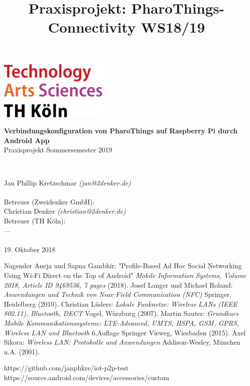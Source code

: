 \documentclass[12pt,a4paper]{article}
\title{Praxisprojekt: PharoThings-Connectivity WS18/19}
\begin{document}
	\begin{titlepage}
    \includegraphics[width=0.4\textwidth]{th_logo.png}
    ~\\[2.5cm]
    \begin{center}
    \textbf{\huge Verbindungskonfiguration von PharoThings auf Raspberry Pi durch Android App}\\[0.5cm]
    {\Large Praxisprojekt Sommersemester 2019}
    \vfill
    \end{center}
    ~\\[2.0cm]
    \begin{flushright}
    {\large Jan Phillip Kretzschmar \it{(jan@2denker.de)}}\\[0.1cm]
    ~\\[1.0cm]
    {\large Betreuer (Zweidenker GmbH):}\\[0.1cm]
    {\large Christian Denker \it{(christian@2denker.de)}}
    ~\\[0.5cm]
    {\large Betreuer (TH Köln):}\\[0.1cm]
    {\large ---}\\[0.1cm]

	~\\[1.0cm]
    {\large 19. Oktober 2018}
	\end{flushright}
    \end{titlepage}
    
    \pagebreak
        
    

    \begin{thebibliography}{10}
        Nagender Aneja und Sapna Gambhir: "Profile-Based Ad Hoc Social Networking Using Wi-Fi Direct on the Top of Android" {\it Mobile Information Systems, Volume 2018, Article ID 9469536, 7 pages} (2018).
        Josef Langer und Michael Roland: {\it Anwendungen und Technik von Near Field Communication (NFC)} Springer, Heidelberg (2010).
        Christian Lüders: {\it Lokale Funknetze: Wireless LANs (IEEE 802.11), Bluetooth, DECT} Vogel, Würzburg (2007).
        Martin Sauter: {\it Grundkurs Mobile Kommunikationssysteme: LTE-Advanced, UMTS, HSPA, GSM, GPRS, Wireless LAN und Bluetooth} 6.Auflage Springer Vieweg, Wiesbaden (2015).
        Axel Sikora: {\it Wireless LAN: Protokolle und Anwendungen} Addison-Wesley, München u.A. (2001).

        https://github.com/janphkre/iot-p2p-test
        https://source.android.com/devices/accessories/custom
    \end{thebibliography}
\end{document}
